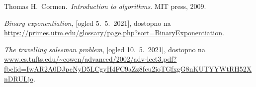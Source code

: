 \documentclass[a4paper,11pt]{article}
\begin{document}
\begin{thebibliography}{99}
    Thomas H.~Cormen.~\emph{Introduction to algorithms}. MIT press, 2009.

    \emph{Binary exponentiation}, [ogled 5.~5.~2021], dostopno na \url{https://primes.utm.edu/glossary/page.php?sort=BinaryExponentiation}.

    \emph{The travelling salesman problem}, [ogled 10.~5.~2021], dostopno na \url{www.cs.tufts.edu/~cowen/advanced/2002/adv-lect3.pdf?fbclid=IwAR2A0DJpcNyD5LCgyH4FC9aZz8fcu2ioTGfxgG8nKUTYYWtRH52XnDRULjo}.

\end{thebibliography}
\end{document}
